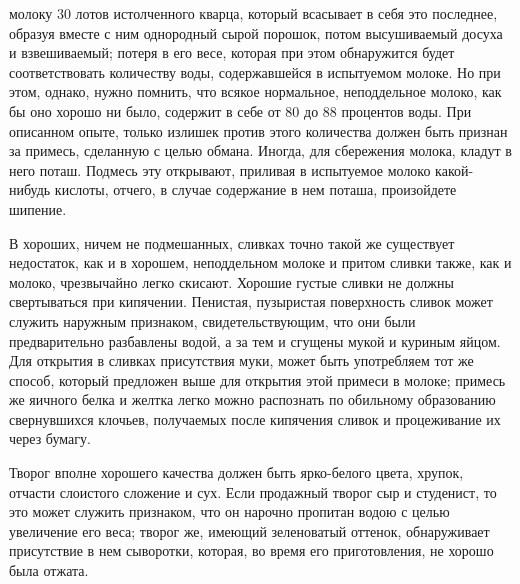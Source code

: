 молоку 30 лотов истолченного кварца, который всасывает в себя это последнее, образуя вместе с ним однородный сырой порошок, потом высушиваемый досуха и взвешиваемый; потеря в его весе, которая при этом обнаружится будет соответствовать количеству воды, содержавшейся в испытуемом молоке. Но при этом, однако, нужно помнить, что всякое нормальное, неподдельное молоко, как бы оно хорошо ни было, содержит в себе от 80 до 88 процентов воды. При описанном опыте, только излишек против этого количества должен быть признан за примесь, сделанную с целью обмана. Иногда, для сбережения молока, кладут в него поташ. Подмесь эту открывают, приливая в испытуемое молоко какой-нибудь кислоты, отчего, в случае содержание в нем поташа, произойдете шипение.

В хороших, ничем не подмешанных, сливках точно такой же существует недостаток, как и в хорошем, неподдельном молоке и притом сливки также, как и молоко, чрезвычайно легко скисают. Хорошие густые сливки не должны свертываться при кипячении. Пенистая, пузыристая поверхность сливок может служить наружным признаком, свидетельствующим, что они были предварительно разбавлены водой, а за тем и сгущены мукой и куриным яйцом. Для открытия в сливках присутствия муки, может быть употребляем тот же способ, который предложен выше для открытия этой примеси в молоке; примесь же яичного белка и желтка легко можно распознать по обильному образованию свернувшихся клочьев, получаемых после кипячения сливок и процеживание их через бумагу.

Творог вполне хорошего качества должен быть ярко-белого цвета, хрупок, отчасти слоистого сложение и сух. Если продажный творог сыр и студенист, то это может служить признаком, что он нарочно пропитан водою с целью увеличение его веса; творог же, имеющий зеленоватый оттенок, обнаруживает присутствие в нем сыворотки, которая, во время его приготовления, не хорошо была отжата.

